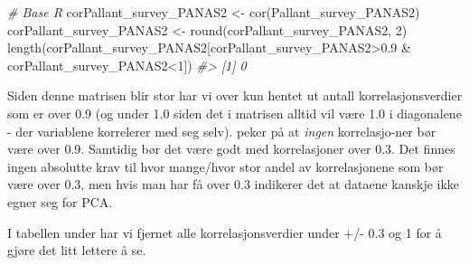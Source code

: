 \documentclass[
]{article}
\newenvironment{Shaded}{\begin{snugshade}}{\end{snugshade}}
\newcommand{\CommentTok}[1]{\textcolor[rgb]{0.56,0.35,0.01}{\textit{#1}}}
\newcommand{\DecValTok}[1]{\textcolor[rgb]{0.00,0.00,0.81}{#1}}
\newcommand{\FloatTok}[1]{\textcolor[rgb]{0.00,0.00,0.81}{#1}}
\newcommand{\FunctionTok}[1]{\textcolor[rgb]{0.00,0.00,0.00}{#1}}
\newcommand{\NormalTok}[1]{#1}
\newcommand{\OtherTok}[1]{\textcolor[rgb]{0.56,0.35,0.01}{#1}}
\newcommand{\SpecialCharTok}[1]{\textcolor[rgb]{0.00,0.00,0.00}{#1}}
\begin{document}
\begin{Shaded}
\begin{Highlighting}[]
\CommentTok{\# Base R}
\NormalTok{corPallant\_survey\_PANAS2 }\OtherTok{\textless{}{-}} \FunctionTok{cor}\NormalTok{(Pallant\_survey\_PANAS2)}
\NormalTok{corPallant\_survey\_PANAS2 }\OtherTok{\textless{}{-}} \FunctionTok{round}\NormalTok{(corPallant\_survey\_PANAS2, }\DecValTok{2}\NormalTok{)}
\FunctionTok{length}\NormalTok{(corPallant\_survey\_PANAS2[corPallant\_survey\_PANAS2}\SpecialCharTok{\textgreater{}}\FloatTok{0.9} \SpecialCharTok{\&}\NormalTok{ corPallant\_survey\_PANAS2}\SpecialCharTok{\textless{}}\DecValTok{1}\NormalTok{])}
\CommentTok{\#\textgreater{} [1] 0}
\end{Highlighting}
\end{Shaded}

Siden denne matrisen blir stor har vi over kun hentet ut antall korrelasjonsverdier som er over 0.9 (og under 1.0 siden det i matrisen alltid vil være 1.0 i diagonalene - der variablene korrelerer med seg selv). \citet{fieldDiscoveringStatisticsUsing2009} peker på at \emph{ingen} korrelasjo-ner bør være over 0.9. Samtidig bør det være godt med korrelasjoner over 0.3. Det finnes ingen absolutte krav til hvor mange/hvor stor andel av korrelasjonene som bør være over 0.3, men hvis man har få over 0.3 indikerer det at dataene kanskje ikke egner seg for PCA.

I tabellen under har vi fjernet alle korrelasjonsverdier under +/- 0.3 og 1 for å gjøre det litt lettere å se.
\end{document}
